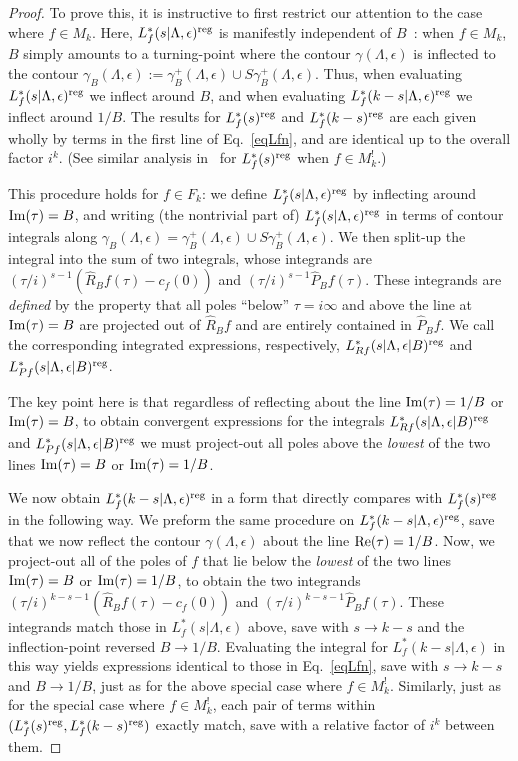 \documentclass[11pt,a4paper]{article}
\newcommand{\g}{\gamma}
\newcommand{\e}{\epsilon}
\newcommand{\La}{\Lambda}
\newcommand{\reg}{{\rm reg}}
\newcommand{\PF}{\widehat{P}} 				%
\newcommand{\RF}{\widehat{R}} 				%
\begin{document}
\begin{proof}
To prove this, it is instructive to first restrict our attention to the case where $f \in M_k$. Here, $L_f^*(s|\La,\e)^\reg$ is  manifestly independent of $B$~\cite{04-BFK}: when $f \in M_k$, $B$ simply amounts to a turning-point where the contour $\g(\La,\e)$ is inflected to the contour $\g_B(\La,\e):= \g_B^+(\La,\e) \cup S\g_B^+(\La,\e)$. Thus, when evaluating $L_f^*(s|\La,\e)^\reg$ we inflect around $B$, and when evaluating $L_f^*(k-s|\La,\e)^\reg$ we inflect around $1/B$. The results for $L_f^*(s)^\reg$ and $L_f^*(k-s)^\reg$ are each given wholly by terms in the first line of Eq.~\eqref{eqLfn}, and are identical up to the overall factor $i^k$. (See similar analysis in~\cite{04-BFK} for $L_f^*(s)^\reg$ when $f \in M_k^!$.)

This procedure holds for $f \in F_k$: we define $L_f^*(s|\La,\e)^\reg$ by inflecting around ${\rm Im}(\tau) = B$, and writing (the nontrivial part of) $L_f^*(s|\La,\e)^\reg$ in terms of contour integrals along $\g_B(\La,\e)= \g_B^+(\La,\e) \cup S\g_B^+(\La,\e)$. We then split-up the integral into the sum of two integrals, whose integrands are $(\tau/i)^{s-1} (\RF_B f(\tau) - c_f(0))$ and $(\tau/i)^{s-1} \PF_B f(\tau)$. These integrands are {\em defined} by the property that all poles ``below'' $\tau = i \infty$ and above the line at ${\rm Im}(\tau) = B$ are projected out of $\RF_B f$ and are entirely contained in $\PF_B f$. We call the corresponding integrated expressions, respectively, $L_{Rf}^*(s|\La,\e|B)^\reg$ and $L_{Pf}^*(s|\La,\e|B)^\reg$.

The key point here is that regardless of reflecting about the line ${\rm Im}(\tau) = 1/B$ or ${\rm Im}(\tau) = B$, to obtain convergent expressions for the integrals $L_{Rf}^*(s|\La,\e|B)^\reg$ and $L_{Pf}^*(s|\La,\e|B)^\reg$ we must project-out all poles above the {\em lowest} of the two lines ${\rm Im}(\tau) = B$ or ${\rm Im}(\tau) = 1/B$. 

We now obtain $L_f^*(k-s|\La,\e)^\reg$ in a form that directly compares with $L_f^*(s)^\reg$ in the following way. We preform the same procedure on $L_f^*(k-s|\La,\e)^\reg$, save that we now reflect the contour $\g(\La,\e)$ about the line ${\rm Re}(\tau) = 1/B$. Now, we project-out all of the poles of $f$ that lie below the {\em lowest} of the two lines ${\rm Im}(\tau) = B$ or ${\rm Im}(\tau) = 1/B$, to obtain the two integrands $(\tau/i)^{k-s-1} (\RF_B f(\tau) -c_f(0))$ and $(\tau/i)^{k-s-1} \PF_B f(\tau)$. These integrands match those in $L_f^*(s|\La,\e)$ above, save with $s \to k-s$ and the inflection-point reversed $B \to 1/B$. Evaluating the integral for $L_f^*(k-s|\La,\e)$ in this way yields expressions identical to those in Eq.~\eqref{eqLfn}, save with $s \to k-s$ and $B \to 1/B$, just as for the above special case where $f \in M_k^!$. Similarly, just as for the special case where $f \in M_k^!$, each pair of terms within $(L_f^*(s)^\reg,L_f^*(k-s)^\reg)$ exactly match, save with a relative factor of $i^k$ between them. 
\end{proof}
\end{document}
